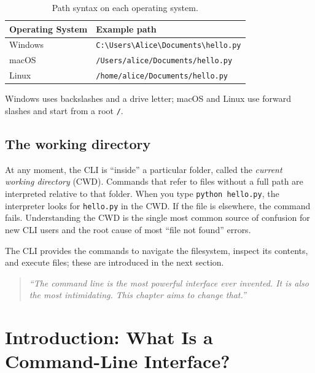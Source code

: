 \begin{table}[htbp]
\centering
\caption{Path syntax on each operating system.}
\label{tab:path-syntax}
\begin{tabular}{p{3.5cm} p{9cm}}
\toprule
\textbf{Operating System} & \textbf{Example path} \\
\midrule
Windows & \texttt{C:\textbackslash Users\textbackslash Alice\textbackslash Documents\textbackslash hello.py} \\
macOS   & \texttt{/Users/alice/Documents/hello.py} \\
Linux   & \texttt{/home/alice/Documents/hello.py} \\
\bottomrule
\end{tabular}
\end{table}

Windows uses backslashes and a drive letter; macOS and Linux use forward
slashes and start from a root \texttt{/}.

\subsection{The working directory}

At any moment, the CLI is ``inside'' a particular folder, called the
\emph{current working directory} (CWD). Commands that refer to files
without a full path are interpreted relative to that folder. When you type
\texttt{python hello.py}, the interpreter looks for \texttt{hello.py} in
the CWD. If the file is elsewhere, the command fails. Understanding the
CWD is the single most common source of confusion for new CLI users and
the root cause of most ``file not found'' errors.

The CLI provides the commands to navigate the filesystem, inspect its
contents, and execute files; these are introduced in the next section.


\begin{quote}
\textit{``The command line is the most powerful interface ever invented.
It is also the most intimidating. This chapter aims to change that.''}
\end{quote}

\section{Introduction: What Is a Command-Line Interface?}
\label{sec:cli-intro}

